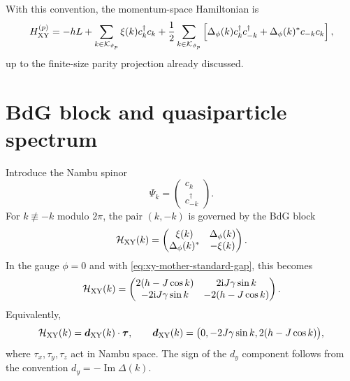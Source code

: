 With this convention, the momentum-space Hamiltonian is
\begin{equation}
\label{eq:xy-mother-momentum-hamiltonian}
    H_{\rm XY}^{(p)}
    =
    -hL
    +
    \sum_{k\in\mathcal{K}_{\vartheta_p}}
    \xi(k)c_k^\dagger c_k
    +
    \frac12
    \sum_{k\in\mathcal{K}_{\vartheta_p}}
    \left[
        \Delta_\phi(k)c_k^\dagger c_{-k}^\dagger
        +
        \Delta_\phi(k)^*c_{-k}c_k
    \right],
\end{equation}
up to the finite-size parity projection already discussed.

\section{BdG block and quasiparticle spectrum}
\label{sec:xy-bdg-block-spectrum}

Introduce the Nambu spinor
\begin{equation}
\label{eq:xy-mother-nambu-spinor}
    \Psi_k=
    \begin{pmatrix}
        c_k\\ c_{-k}^\dagger
    \end{pmatrix}.
\end{equation}
For $k\not\equiv -k$ modulo $2\pi$, the pair $(k,-k)$ is governed by the BdG
block
\begin{equation}
\label{eq:xy-mother-bdg-block}
    \mathcal{H}_{\rm XY}(k)
    =
    \begin{pmatrix}
        \xi(k)&\Delta_\phi(k)\\
        \Delta_\phi(k)^*&-\xi(k)
    \end{pmatrix}.
\end{equation}
In the gauge $\phi=0$ and with \cref{eq:xy-mother-standard-gap}, this becomes
\begin{equation}
\label{eq:xy-mother-bdg-block-explicit}
    \mathcal{H}_{\rm XY}(k)
    =
    \begin{pmatrix}
        2(h-J\cos k)&2\mathrm{i} J\gamma\sin k\\
        -2\mathrm{i} J\gamma\sin k&-2(h-J\cos k)
    \end{pmatrix}.
\end{equation}
Equivalently,
\begin{equation}
\label{eq:xy-mother-d-vector}
    \mathcal{H}_{\rm XY}(k)
    =
    \bm d_{\rm XY}(k)\cdot\bm\tau,
    \qquad
    \bm d_{\rm XY}(k)
    =
    \bigl(0,-2J\gamma\sin k,2(h-J\cos k)\bigr),
\end{equation}
where $\tau_x,\tau_y,\tau_z$ act in Nambu space.  The sign of the $d_y$
component follows from the convention $d_y=-\operatorname{Im}\Delta(k)$.

